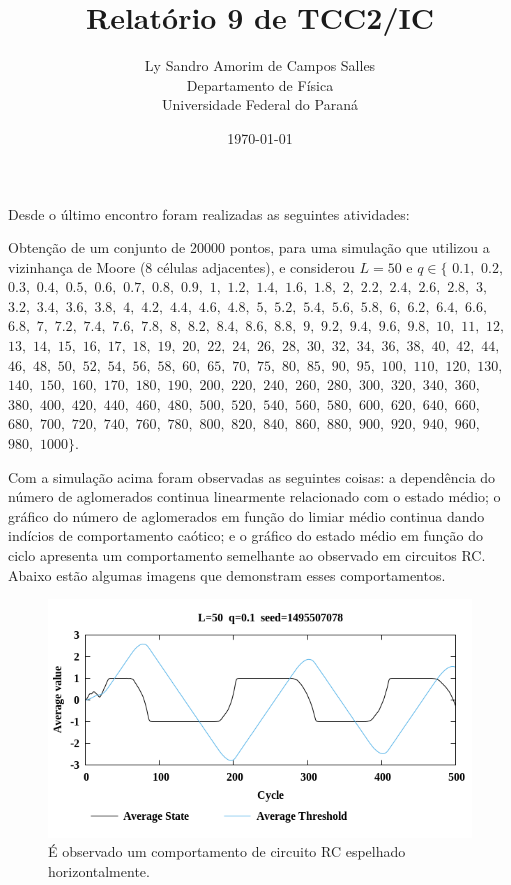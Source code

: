 \documentclass[12pt,a4paper,final]{article}
\title{Relatório 9 de TCC2/IC}
\author{Ly Sandro Amorim de Campos Salles\\Departamento de Física\\Universidade Federal do Paraná}
\date{\today}
\begin{document}
	\maketitle

  Desde o último encontro foram realizadas as seguintes atividades:

  Obtenção de um conjunto de 20000 pontos, para uma simulação que utilizou a vizinhança de Moore (8 células adjacentes), e considerou $L=50$ e $q\in\{$ 
  $0.1,$ $0.2,$ $0.3,$ $0.4,$ $0.5,$ $0.6,$ $0.7,$ $0.8,$ $0.9,$
  $1,$ $1.2,$ $1.4,$ $1.6,$ $1.8,$ 
  $2,$ $2.2,$ $2.4,$ $2.6,$ $2.8,$ 
  $3,$ $3.2,$ $3.4,$ $3.6,$ $3.8,$
  $4,$ $4.2,$ $4.4,$ $4.6,$ $4.8,$
  $5,$ $5.2,$ $5.4,$ $5.6,$ $5.8,$
  $6,$ $6.2,$ $6.4,$ $6.6,$ $6.8,$
  $7,$ $7.2,$ $7.4,$ $7.6,$ $7.8,$
  $8,$ $8.2,$ $8.4,$ $8.6,$ $8.8,$
  $9,$ $9.2,$ $9.4,$ $9.6,$ $9.8,$ $10,$
  $11,$ $12,$ $13,$ $14,$ $15,$ $16,$ $17,$ $18,$ $19,$ $20,$
  $22,$ $24,$ $26,$ $28,$ $30,$ $32,$ $34,$ $36,$ $38,$ $40,$
  $42,$ $44,$ $46,$ $48,$ $50,$ $52,$ $54,$ $56,$ $58,$ $60,$
  $65,$ $70,$ $75,$ $80,$ $85,$ $90,$ $95,$ $100,$ $110,$
  $120,$ $130,$ $140,$ $150,$ $160,$ $170,$ $180,$ $190,$
  $200,$ $220,$ $240,$ $260,$ $280,$ $300,$ $320,$ $340,$ $360,$ $380,$
  $400,$ $420,$ $440,$ $460,$ $480,$ $500,$ $520,$ $540,$ $560,$ $580,$
  $600,$ $620,$ $640,$ $660,$ $680,$ $700,$ $720,$ $740,$ $760,$ $780,$
  $800,$ $820,$ $840,$ $860,$ $880,$ $900,$ $920,$ $940,$ $960,$ $980,$
  $1000\}$. 

  Com a simulação acima foram observadas as seguintes coisas: a dependência do número de aglomerados continua linearmente relacionado com o estado médio; o gráfico do número de aglomerados em função do limiar médio continua dando indícios de comportamento caótico; e o gráfico do estado médio em função do ciclo apresenta um comportamento semelhante ao observado em circuitos RC. Abaixo estão algumas imagens que demonstram esses comportamentos.

  \begin{figure}[h]
    \centering
    \includegraphics[width=.7\linewidth]{ICA-L50-q0_100-seed1495507078-AvgStateAvgThresVsCycle.png}
    \caption{É observado um comportamento de circuito RC espelhado horizontalmente.}
  \end{figure}
\end{document}
